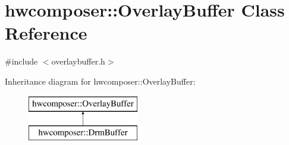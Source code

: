 \hypertarget{classhwcomposer_1_1OverlayBuffer}{}\section{hwcomposer\+:\+:Overlay\+Buffer Class Reference}
\label{classhwcomposer_1_1OverlayBuffer}


{\ttfamily \#include $<$overlaybuffer.\+h$>$}

Inheritance diagram for hwcomposer\+:\+:Overlay\+Buffer\+:\begin{figure}[H]
\begin{center}
\leavevmode
\includegraphics[height=2.000000cm]{classhwcomposer_1_1OverlayBuffer}
\end{center}
\end{figure}
